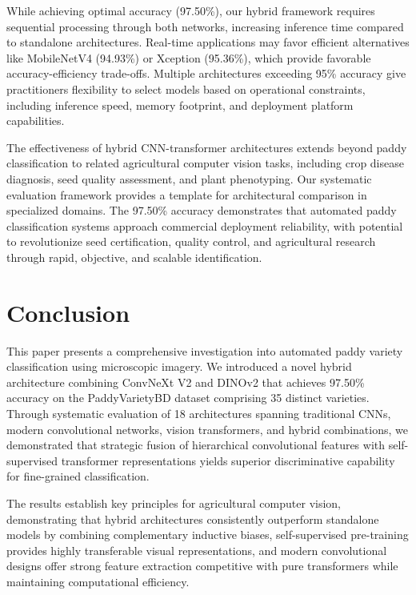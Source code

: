 \documentclass[conference]{IEEEtran}
\begin{document}
While achieving optimal accuracy (97.50\%), our hybrid framework requires sequential processing through both networks, increasing inference time compared to standalone architectures. Real-time applications may favor efficient alternatives like MobileNetV4 (94.93\%) or Xception (95.36\%), which provide favorable accuracy-efficiency trade-offs. Multiple architectures exceeding 95\% accuracy give practitioners flexibility to select models based on operational constraints, including inference speed, memory footprint, and deployment platform capabilities.

The effectiveness of hybrid CNN-transformer architectures extends beyond paddy classification to related agricultural computer vision tasks, including crop disease diagnosis, seed quality assessment, and plant phenotyping. Our systematic evaluation framework provides a template for architectural comparison in specialized domains. The 97.50\% accuracy demonstrates that automated paddy classification systems approach commercial deployment reliability, with potential to revolutionize seed certification, quality control, and agricultural research through rapid, objective, and scalable identification.


\section{Conclusion}

This paper presents a comprehensive investigation into automated paddy variety classification using microscopic imagery. We introduced a novel hybrid architecture combining ConvNeXt V2 and DINOv2 that achieves 97.50\% accuracy on the PaddyVarietyBD dataset comprising 35 distinct varieties. Through systematic evaluation of 18 architectures spanning traditional CNNs, modern convolutional networks, vision transformers, and hybrid combinations, we demonstrated that strategic fusion of hierarchical convolutional features with self-supervised transformer representations yields superior discriminative capability for fine-grained classification.

The results establish key principles for agricultural computer vision, demonstrating that hybrid architectures consistently outperform standalone models by combining complementary inductive biases, self-supervised pre-training provides highly transferable visual representations, and modern convolutional designs offer strong feature extraction competitive with pure transformers while maintaining computational efficiency.
\end{document}
